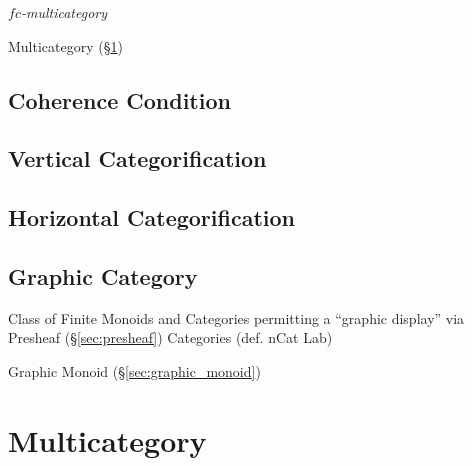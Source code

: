 \emph{$fc$-multicategory}

Multicategory (\S\ref{sec:multicategory})



\subsection{Coherence Condition}\label{sec:coherence_condition}




\subsection{Vertical Categorification}
\label{sec:vertical_categorification}

\subsection{Horizontal Categorification}
\label{sec:horizontal_categorification}

\subsection{Graphic Category}\label{sec:graphic_category}

Class of Finite Monoids and Categories permitting a ``graphic
display'' via Presheaf (\S\ref{sec:presheaf}) Categories
(def. nCat Lab) %

Graphic Monoid (\S\ref{sec:graphic_monoid})



\section{Multicategory}\label{sec:multicategory}

